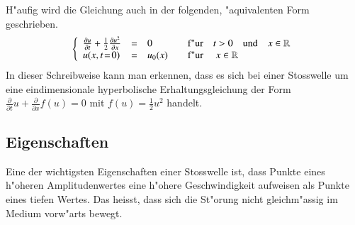 \begin{refsection}
H"aufig wird die Gleichung auch in der folgenden, "aquivalenten Form
geschrieben.
\begin{equation}
	\left\{
	\begin{array}{lcl}
		\frac{\partial u}{\partial t} + \frac{1}{2}\frac{\partial u^{2}}{\partial x} &=& 0 \hspace{1.25cm} \text{f"ur} \quad t>0 \quad \text{und} \quad x \in \mathbb{R} \\
		u(x,t\!=\!0) &=& u_{0}(x) \qquad \text{f"ur } \quad x \in \mathbb{R} 
	\end{array} \right.
	\label{stosswellen:burgeq2}
\end{equation}
In dieser Schreibweise kann man erkennen, dass es sich
bei einer Stosswelle um eine eindimensionale hyperbolische
Erhaltungsgleichung\cite{stoss:erhaltungsgleichung} der Form
$\frac{\partial}{\partial t}u + \frac{\partial}{\partial x} f(u) = 0$
mit $f(u) = \frac{1}{2}u^{2}$ handelt.

\subsection{Eigenschaften}
Eine der wichtigsten Eigenschaften einer Stosswelle ist, dass Punkte
eines h"oheren Amplitudenwertes eine h"ohere Geschwindigkeit aufweisen
als Punkte eines tiefen Wertes. Das heisst, dass sich die St"orung nicht
gleichm"assig im Medium vorw"arts bewegt.


\end{refsection}
